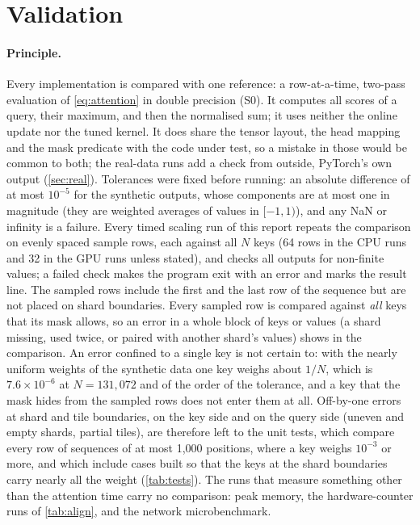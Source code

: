 \section{Validation}\label{sec:validation}

\paragraph{Principle.} Every implementation is compared with one reference: a
row-at-a-time, two-pass evaluation of \cref{eq:attention} in double precision (S0).
It computes all scores of a query, their maximum, and then the normalised sum; it
uses neither the online update nor the tuned kernel. It does share the tensor
layout, the head mapping and the mask predicate with the code under test, so a
mistake in those would be common to both; the real-data runs add a check from
outside, PyTorch's own output (\cref{sec:real}). Tolerances were fixed before
running: an absolute difference of at most $10^{-5}$ for the synthetic outputs,
whose components are at most one in magnitude (they are weighted averages of values
in $[-1,1)$), and any NaN or infinity is a failure. Every timed scaling run of this
report repeats the comparison on evenly spaced sample rows, each against all $N$
keys (64 rows in the CPU runs and 32 in the GPU runs unless stated), and checks all
outputs for non-finite values; a failed check makes the program exit with an error
and marks the result line. The sampled rows include the first and the last row of
the sequence but are not placed on shard boundaries. Every sampled row is
compared against \emph{all} keys that its mask allows, so an error in a whole block
of keys or values (a shard missing, used twice, or paired with another shard's
values) shows in the comparison. An error confined to a single key is not certain
to: with the nearly uniform weights of the synthetic data one key weighs about
$1/N$, which is $7.6\times10^{-6}$ at $N=131{,}072$ and of the order of the
tolerance, and a key that the mask hides from the sampled rows does not enter them
at all. Off-by-one errors at shard and tile boundaries, on the key side and on the
query side (uneven and empty shards, partial tiles), are therefore left to the unit
tests, which compare every row of sequences of at most 1{,}000 positions, where a
key weighs $10^{-3}$ or more, and which include cases built so that the keys at the
shard boundaries carry nearly all the weight (\cref{tab:tests}). The runs that measure something other than the attention
time carry no comparison: peak memory, the hardware-counter runs of
\cref{tab:align}, and the network microbenchmark.

